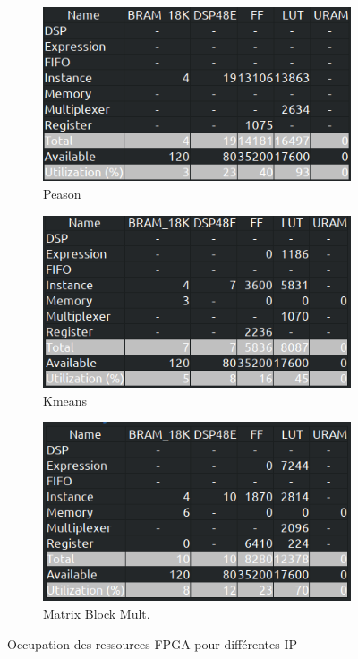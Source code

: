 \documentclass[12pt,a4paper]{article}
\begin{document}
\begin{figure}[H]
	\centering
	\begin{subfigure}[H]{.3\linewidth}
		\centering
		\includegraphics[width=\linewidth]{hls_fig/screenshot001}
		\caption{Peason}
	\end{subfigure}
	\begin{subfigure}[H]{.3\linewidth}
		\centering
		\includegraphics[width=\linewidth]{hls_fig/screenshot002}
		\caption{Kmeans}
	\end{subfigure}
	\begin{subfigure}[H]{.3\linewidth}
		\centering
		\includegraphics[width=\linewidth]{hls_fig/screenshot003}
		\caption{Matrix Block Mult.}
	\end{subfigure}	
	\caption{Occupation des ressources FPGA pour différentes IP}
	\label{fig-hls}
\end{figure}
\end{document}
